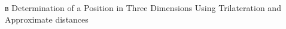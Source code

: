 в \cite{yonei} \cite{murphy} Determination of a Position in Three Dimensions Using Trilateration and Approximate distances